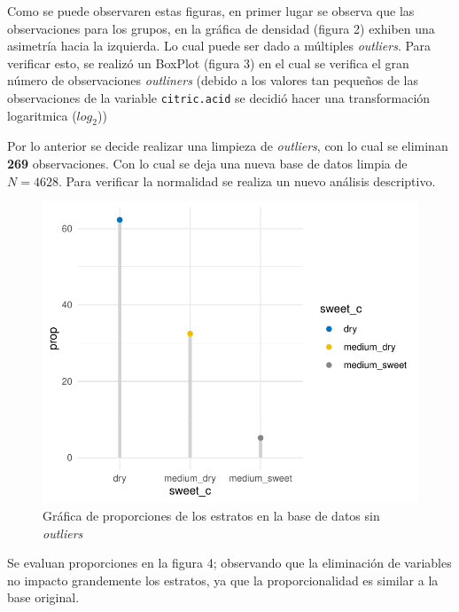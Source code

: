 \documentclass[
]{article}
\begin{document}
Como se puede observaren estas figuras, en primer lugar se observa que
las observaciones para los grupos, en la gráfica de densidad (figura 2)
exhiben una asimetría hacia la izquierda. Lo cual puede ser dado a
múltiples \emph{outliers}. Para verificar esto, se realizó un BoxPlot
(figura 3) en el cual se verifica el gran número de observaciones
\emph{outliners} (debido a los valores tan pequeños de las observaciones
de la variable \texttt{citric.acid} se decidió hacer una transformación
logaritmica (\(log_2\)))

Por lo anterior se decide realizar una limpieza de \emph{outliers}, con
lo cual se eliminan \textbf{269} observaciones. Con lo cual se deja una
nueva base de datos limpia de \(N = 4628\). Para verificar la normalidad
se realiza un nuevo análisis descriptivo.

\begin{figure}
\centering
\includegraphics{test_2_files/figure-latex/proportion tidy-1.pdf}
\caption{Gráfica de proporciones de los estratos en la base de datos sin
\emph{outliers}}
\end{figure}

Se evaluan proporciones en la figura 4; observando que la eliminación de
variables no impacto grandemente los estratos, ya que la
proporcionalidad es similar a la base original.
\end{document}
